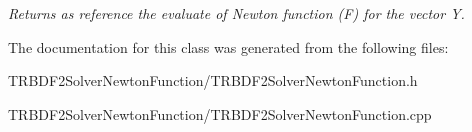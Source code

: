 \begin{DoxyCompactItemize}
\begin{DoxyCompactList}\small\item\em Returns as reference the evaluate of Newton function (F) for the vector Y. \item\end{DoxyCompactList}\end{DoxyCompactItemize}


The documentation for this class was generated from the following files:\begin{DoxyCompactItemize}
\item 
TRBDF2SolverNewtonFunction/TRBDF2SolverNewtonFunction.h\item 
TRBDF2SolverNewtonFunction/TRBDF2SolverNewtonFunction.cpp\end{DoxyCompactItemize}
